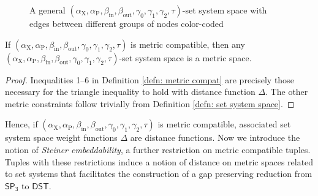 \documentclass{article}\providecommand{\DeclareRedundantLanguages}[2]{}\usepackage[a4paper,margin=20mm]{geometry}
\newcommand{\1}{\textbf{1}}
\newcommand{\setpT}{$\mathsf{SP_3}$\xspace}
\newcommand{\dst}{$\mathsf{DST}$\xspace}
\newcommand{\td}{\tau}
\newcommand{\srd}{\alpha_{\text{X}}}
\newcommand{\trd}{\alpha_{\text{P}}}
\begin{document}
\begin{figure}[!ht]





    \caption{A general $(\srd, \trd, \beta_{\text{in}}, \beta_{\text{out}}, \gamma_0, \gamma_1, \gamma_2, \td)$-set system space with edges between different groups of nodes color-coded}
    \label{fig: set system space}
\end{figure}


\begin{proposition}
If $(\srd, \trd, \beta_{\text{in}}, \beta_{\text{out}}, \gamma_0, \gamma_1, \gamma_2, \td)$ is metric compatible, then any \\$(\srd, \trd, \beta_{\text{in}}, \beta_{\text{out}}, \gamma_0, \gamma_1, \gamma_2, \td)$-set system space is a metric space.
\end{proposition}
\begin{proof}
Inequalities 1–6 in Definition \ref{defn: metric compat} are precisely those necessary for the triangle inequality to hold with distance function $\Delta$. The other metric constraints follow trivially from Definition \ref{defn: set system space}.
\end{proof}

Hence, if $(\srd, \trd, \beta_{\text{in}}, \beta_{\text{out}}, \gamma_0, \gamma_1, \gamma_2, \td)$ is metric compatible, associated set system space weight functions $\Delta$ are distance functions. Now we introduce the notion of \textit{Steiner embeddability}, a further restriction on metric compatible tuples. Tuples with these restrictions induce a notion of distance on metric spaces related to set systems that facilitates the construction of a gap preserving reduction from \setpT to \dst. 
\end{document}
